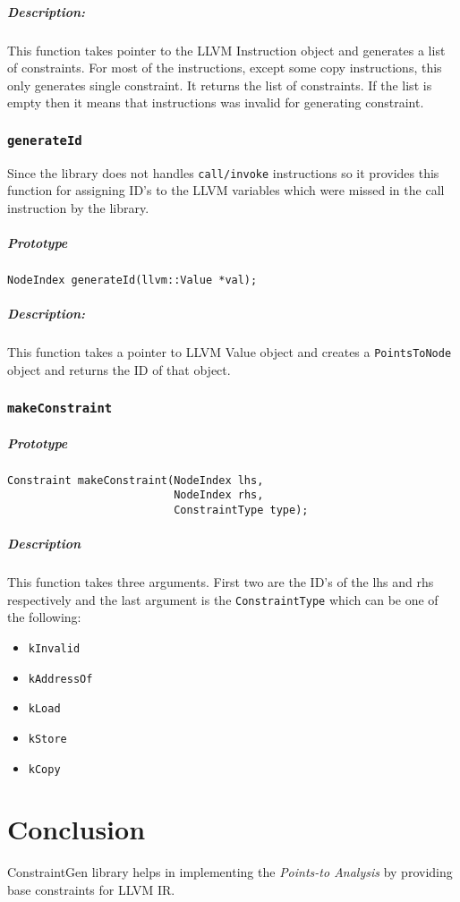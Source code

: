 \documentclass[a4paper,12pt]{report}
\begin{document}
\paragraph{Description:}
This function takes pointer to the LLVM Instruction object and generates a list
of constraints. For most of the instructions, except some copy instructions,
this only generates single constraint. It returns the list of constraints. If
the list is empty then it means that instructions was invalid for generating
constraint.

\subsection{\texttt{generateId}}
Since the library does not handles \texttt{call/invoke} instructions so it provides
this function for assigning ID's to the LLVM variables which were missed in the call
instruction by the library.

\paragraph{Prototype}
\begin{verbatim}
NodeIndex generateId(llvm::Value *val);
\end{verbatim}

\paragraph{Description:}
This function takes a pointer to LLVM Value object and creates a \texttt{PointsToNode}
object and returns the ID of that object.

\subsection{\texttt{makeConstraint}}
\paragraph{Prototype}
\begin{verbatim}
Constraint makeConstraint(NodeIndex lhs,
                          NodeIndex rhs,
                          ConstraintType type);
\end{verbatim}

\paragraph{Description}
This function takes three arguments. First two are the ID's of the lhs and rhs
respectively and the last argument is the \texttt{ConstraintType} which can be
one of the following:
\begin{itemize}
    \item \texttt{kInvalid}
    \item \texttt{kAddressOf}
    \item \texttt{kLoad}
    \item \texttt{kStore}
    \item \texttt{kCopy}
\end{itemize}

\chapter{Conclusion}
ConstraintGen library helps in implementing the \textit{Points-to Analysis} by
providing base constraints for LLVM IR.




\end{document}
